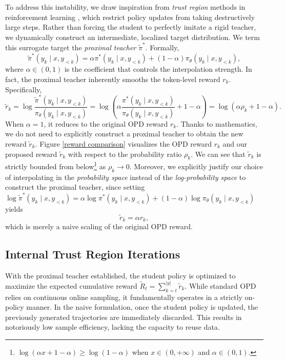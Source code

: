 \documentclass{article}
\theoremstyle{plain}
\theoremstyle{definition}
\theoremstyle{remark}
\begin{document}
To address this instability, we draw inspiration from \textit{trust region} methods in reinforcement learning \citep{schulman2015trust, schulman2017proximal, xie2025simple}, which restrict policy updates from taking destructively large steps. Rather than forcing the student to perfectly imitate a rigid teacher, we dynamically construct an intermediate, localized target distribution. We term this surrogate target the \textit{proximal teacher} $\tilde{\pi}^*$. Formally,
\begin{equation*}
	\tilde{\pi}^*(y_k\mid x,y_{<k})=\alpha\pi^*(y_k\mid x,y_{<k})+(1-\alpha)\pi_{\theta}(y_k\mid x,y_{<k}),
\end{equation*}
where $\alpha\in(0,1)$ is the coefficient that controls the interpolation strength. In fact, the proximal teacher inherently smooths the token-level reward $r_k$. Specifically,
\begin{equation}
	\tilde{r}_k=\log\frac{\tilde{\pi}^*(y_k\mid x,y_{<k})}{\pi_{\theta}(y_k\mid x,y_{<k})}=\log\left(\alpha\frac{\pi^*(y_k\mid x,y_{<k})}{\pi_{\theta}(y_k\mid x,y_{<k})}+1-\alpha\right)=\log\left(\alpha\rho_k+1-\alpha\right).
\end{equation}
When $\alpha=1$, it reduces to the original OPD reward $r_k$. Thanks to mathematics, we do not need to explicitly construct a proximal teacher to obtain the new reward $\tilde{r}_k$. Figure \ref{reward comparison} visualizes the OPD reward $r_k$ and our proposed reward $\tilde{r}_k$ with respect to the probability ratio $\rho_k$. We can see that $\tilde{r}_k$ is strictly bounded from below\footnote{$\log(\alpha x+1-\alpha)\geq\log(1-\alpha)$ when $x\in(0,+\infty)$ and $\alpha\in(0,1)$.} as $\rho_k\rightarrow0$. Moreover, we explicitly justify our choice of interpolating in the \textit{probability space} instead of the \textit{log-probability space} to construct the proximal teacher, since setting $\log\tilde{\pi}^*(y_k\mid x,y_{<k})=\alpha\log\pi^*(y_k\mid x,y_{<k})+(1-\alpha)\log\pi_{\theta}(y_k\mid x,y_{<k})$ yields
\begin{equation}
	\tilde{r}_k=\alpha r_k,
\end{equation}
which is merely a naive scaling of the original OPD reward.



\subsection{Internal Trust Region Iterations}\label{Internal Trust Region Iterations}
With the proximal teacher established, the student policy is optimized to maximize the expected cumulative reward $\tilde{R}_t=\sum_{k=t}^{\lvert y\rvert}\tilde{r}_k$. While standard OPD relies on continuous online sampling, it fundamentally operates in a strictly on-policy manner. In the naive formulation, once the student policy is updated, the previously generated trajectories are immediately discarded. This results in notoriously low sample efficiency, lacking the capacity to reuse data.
\end{document}
